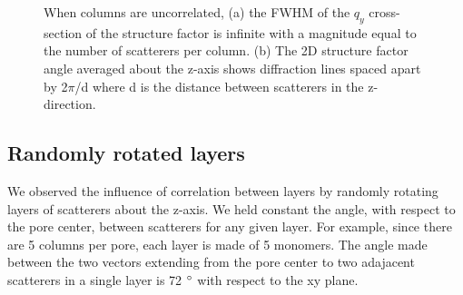 \documentclass{article}
\begin{document}
\begin{figure}[!htb]
\begin{subfigure}{0.45\textwidth}
  \caption{}\label{fig:random_columns_rzplot}
  \end{subfigure}
  \caption{When columns are uncorrelated, (a) the FWHM of the $q_y$
	  cross-section of the structure factor is infinite with a magnitude equal to the
	  number of scatterers per column. (b) The 2D structure factor angle averaged 
          about the z-axis shows diffraction lines spaced apart by 2$\pi$/d where d is the
          distance between scatterers in the z-direction.}\label{fig:random_columns_rpi_width}
  \end{figure}

  \subsection{Randomly rotated layers}

  We observed the influence of correlation between layers by randomly rotating layers
  of scatterers about the z-axis. We held constant the angle, with respect to the pore
  center, between scatterers for any given layer. For example, since there are 5 
  columns per pore, each layer is made of 5 monomers. The angle made between the two 
  vectors extending from the pore center to two adajacent scatterers in a single layer
  is 72 $\degree$ with respect to the xy plane.  
\end{document}
